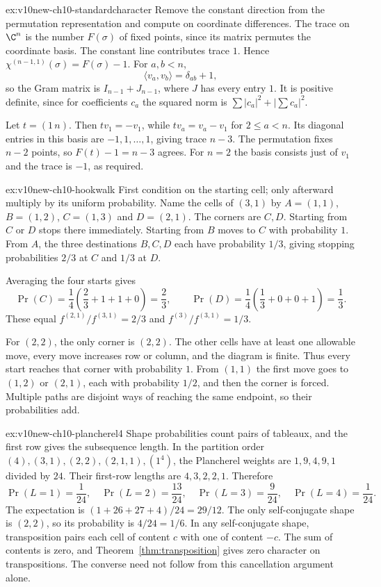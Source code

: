 \begin{solution}{ex:v10new-ch10-standardcharacter}
\idea Remove the constant direction from the permutation representation and compute on coordinate differences.
\writeup The trace on $\C^n$ is the number $F(\sigma)$ of fixed points, since its matrix permutes the coordinate basis. The constant line contributes trace $1$. Hence
$\chi^{(n-1,1)}(\sigma)=F(\sigma)-1$.
For $a,b<n$,
\[
\langle v_a,v_b\rangle=\delta_{ab}+1,
\]
so the Gram matrix is $I_{n-1}+J_{n-1}$, where $J$ has every entry $1$. It is positive definite, since for coefficients $c_a$ the squared norm is $\sum|c_a|^2+|\sum c_a|^2$.

Let $t=(1\,n)$. Then $tv_1=-v_1$, while $tv_a=v_a-v_1$ for $2\le a<n$. Its diagonal entries in this basis are $-1,1,\ldots,1$, giving trace $n-3$. The permutation fixes $n-2$ points, so $F(t)-1=n-3$ agrees. For $n=2$ the basis consists just of $v_1$ and the trace is $-1$, as required.
\end{solution}

\begin{solution}{ex:v10new-ch10-hookwalk}
\idea First condition on the starting cell; only afterward multiply by its uniform probability.
\writeup Name the cells of $(3,1)$ by $A=(1,1)$, $B=(1,2)$, $C=(1,3)$ and $D=(2,1)$. The corners are $C,D$. Starting from $C$ or $D$ stops there immediately. Starting from $B$ moves to $C$ with probability $1$. From $A$, the three destinations $B,C,D$ each have probability $1/3$, giving stopping probabilities $2/3$ at $C$ and $1/3$ at $D$.

Averaging the four starts gives
\[
\Pr(C)=\frac14\left(\frac23+1+1+0\right)=\frac23,
\qquad
\Pr(D)=\frac14\left(\frac13+0+0+1\right)=\frac13.
\]
These equal $f^{(2,1)}/f^{(3,1)}=2/3$ and $f^{(3)}/f^{(3,1)}=1/3$.

For $(2,2)$, the only corner is $(2,2)$. The other cells have at least one allowable move, every move increases row or column, and the diagram is finite. Thus every start reaches that corner with probability $1$. From $(1,1)$ the first move goes to $(1,2)$ or $(2,1)$, each with probability $1/2$, and then the corner is forced. Multiple paths are disjoint ways of reaching the same endpoint, so their probabilities add.
\end{solution}

\begin{solution}{ex:v10new-ch10-plancherel4}
\idea Shape probabilities count pairs of tableaux, and the first row gives the subsequence length.
\writeup In the partition order $(4),(3,1),(2,2),(2,1,1),(1^4)$, the Plancherel weights are $1,9,4,9,1$ divided by $24$. Their first-row lengths are $4,3,2,2,1$. Therefore
\[
\Pr(L=1)=\frac1{24},\quad
\Pr(L=2)=\frac{13}{24},\quad
\Pr(L=3)=\frac9{24},\quad
\Pr(L=4)=\frac1{24}.
\]
The expectation is $(1+26+27+4)/24=29/12$. The only self-conjugate shape is $(2,2)$, so its probability is $4/24=1/6$. In any self-conjugate shape, transposition pairs each cell of content $c$ with one of content $-c$. The sum of contents is zero, and Theorem~\ref{thm:transposition} gives zero character on transpositions. The converse need not follow from this cancellation argument alone.
\end{solution}

